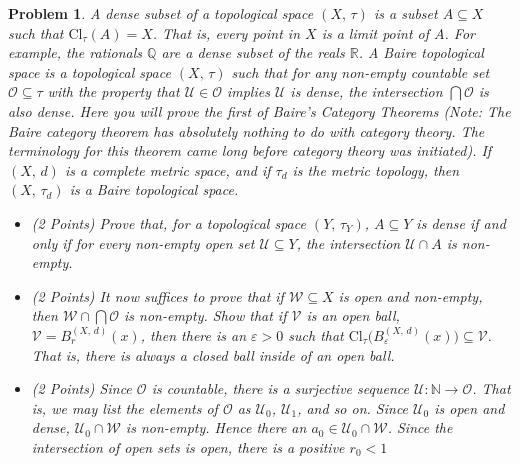 \documentclass{article}
\theoremstyle{normal}
\newtheorem{problem}{Problem}
\begin{document}
    \begin{problem}
        A dense subset of a topological space $(X,\,\tau)$ is a subset
        $A\subseteq{X}$ such that $\textrm{Cl}_{\tau}(A)=X$. That is, every
        point in $X$ is a limit point of $A$. For example, the rationals
        $\mathbb{Q}$ are a dense subset of the reals $\mathbb{R}$.
        A Baire topological space is a topological space $(X,\,\tau)$ such that
        for any non-empty countable set $\mathcal{O}\subseteq\tau$ with the
        property that $\mathcal{U}\in\mathcal{O}$ implies $\mathcal{U}$ is
        dense, the intersection $\bigcap\mathcal{O}$ is also dense. Here you
        will prove the first of Baire's Category Theorems (Note: The Baire
        category theorem has absolutely nothing to do with category theory.
        The terminology for this theorem came long before category theory was
        initiated). If $(X,\,d)$ is a complete metric space, and if
        $\tau_{d}$ is the metric topology, then $(X,\,\tau_{d})$ is a Baire
        topological space.
        \begin{itemize}
            \item (2 Points) Prove that, for a topological space
                $(Y,\,\tau_{Y})$, $A\subseteq{Y}$ is dense if and only if
                for every non-empty open set $\mathcal{U}\subseteq{Y}$, the
                intersection $\mathcal{U}\cap{A}$ is non-empty.
            \item (2 Points) It now suffices to prove that if
                $\mathcal{W}\subseteq{X}$ is open and non-empty, then
                $\mathcal{W}\cap\bigcap\mathcal{O}$ is non-empty. Show that if
                $\mathcal{V}$ is an open ball,
                $\mathcal{V}=B_{r}^{(X,\,d)}(x)$, then there is an
                $\varepsilon>0$ such that
                $\textrm{Cl}_{\tau}\big(B_{\varepsilon}^{(X,\,d)}(x)\big)\subseteq\mathcal{V}$.
                That is, there is always a \textit{closed ball} inside of an
                open ball.
            \item (2 Points) Since $\mathcal{O}$ is countable, there is a
                surjective sequence
                $\mathcal{U}:\mathbb{N}\rightarrow\mathcal{O}$. That
                is, we may list the elements of $\mathcal{O}$ as $\mathcal{U}_{0}$,
                $\mathcal{U}_{1}$, and so on. Since $\mathcal{U}_{0}$ is open
                and dense, $\mathcal{U}_{0}\cap\mathcal{W}$ is non-empty. Hence
                there an $a_{0}\in\mathcal{U}_{0}\cap\mathcal{W}$. Since the
                intersection of open sets is open, there is a positive $r_{0}<1$

\end{itemize}
\end{problem}
\end{document}
